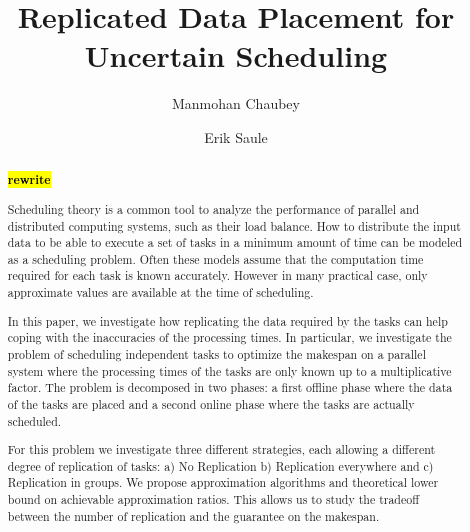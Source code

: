 \documentclass[twocolumn]{svjour3}
\newcommand{\todo}[1]{{\color{red}\textbf{\hl{#1}}\xspace}}
\begin{document}
\title{Replicated Data Placement for Uncertain Scheduling}

\author{Manmohan Chaubey \and Erik Saule}



\maketitle


\begin{abstract}
\todo{rewrite}

  Scheduling theory is a common tool to analyze the performance of
  parallel and distributed computing systems, such as their load
  balance. How to distribute the input data to be able to execute a
  set of tasks in a minimum amount of time can be modeled as a
  scheduling problem. Often these models assume that the computation
  time required for each task is known accurately. However in many
  practical case, only approximate values are available at the time of
  scheduling.

  In this paper, we investigate how replicating the data required by
  the tasks can help coping with the inaccuracies of the processing
  times. In particular, we investigate the problem of scheduling
  independent tasks to optimize the makespan on a parallel system
  where the processing times of the tasks are only known up to a
  multiplicative factor. The problem is decomposed in two phases: a
  first offline phase where the data of the tasks are placed and a
  second online phase where the tasks are actually scheduled.

  For this problem we investigate three different strategies, each
  allowing a different degree of replication of tasks: a) No
  Replication b) Replication everywhere and c) Replication in
  groups. We propose approximation algorithms and theoretical lower
  bound on achievable approximation ratios.  This allows us to study
  the tradeoff between the number of replication and the guarantee on
  the makespan.

\end{abstract}
\end{document}

